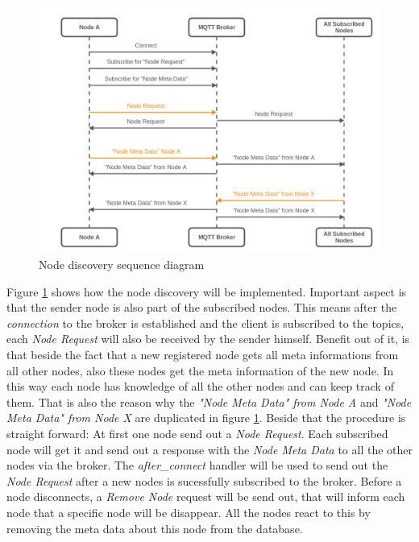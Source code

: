 \begin{figure}[H]
    \centering
    \includegraphics[width=\textwidth]{resources/images/node_discovery.png}
    \caption[Node discovery sequence diagram]{Node discovery sequence diagram}
    \label{fig:node_discovery_squ_dia}
\end{figure}

Figure \ref{fig:node_discovery_squ_dia} shows how the node discovery will be implemented.
Important aspect is that the sender node is also part of the subscribed nodes.
This means after the \textit{connection} to the broker is established and the client is subscribed to the topics, each \textit{Node Request} will also be received by the sender himself.
Benefit out of it, is that beside the fact that a new registered node gets all meta informations from all other nodes, also these nodes get the meta information of the new node.
In this way each node has knowledge of all the other nodes and can keep track of them.
That is also the reason why the \textit{"Node Meta Data" from Node A} and \textit{"Node Meta Data" from Node X} are duplicated in figure \ref{fig:node_discovery_squ_dia}.
Beside that the procedure is straight forward: At first one node send out a \textit{Node Request}.
Each subscribed node will get it and send out a response with the \textit{Node Meta Data} to all the other nodes via the broker.
The \textit{after\_connect} handler will be used to send out the \textit{Node Request} after a new nodes is sucessfully subscribed to the broker.
Before a node disconnects, a \textit{Remove Node} request will be send out, that will inform each node that a specific node will be disappear.
All the nodes react to this by removing the meta data about this node from the database.

